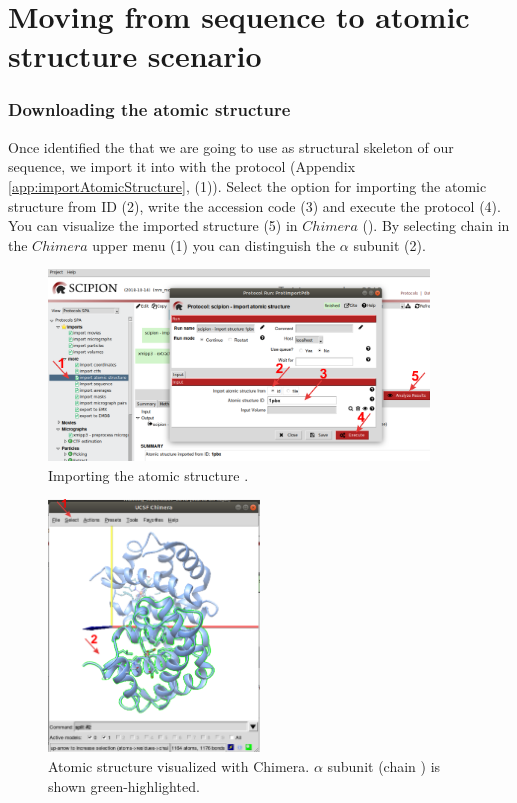 \section{Moving from sequence to atomic structure scenario}

\subsubsection*{Downloading the atomic structure}
  
  Once identified the  that we are going to use as structural skeleton of our sequence, we import it into \scipion with the protocol  (Appendix \ref{app:importAtomicStructure},   (1)). Select the option for importing the atomic structure from ID (2), write the  accession code (3) and execute the protocol (4). You can visualize the imported structure (5) in $Chimera$ (). By selecting chain  in the $Chimera$ upper menu (1) you can distinguish the  $\alpha$ subunit (2).
  
  \begin{figure}[H]
  \centering 
  \captionsetup{width=.7\linewidth} 
  \includegraphics[width=0.90\textwidth]{Images/Fig10.png}
  \caption{Importing the atomic structure .}
  \label{fig:import_atomic_structure}
  \end{figure}
  
  \begin{figure}[H]
  \centering 
  \captionsetup{width=.7\linewidth} 
  \includegraphics[width=0.50\textwidth]{Images/Fig11.png}
  \caption{Atomic structure  visualized with Chimera.  $\alpha$ subunit (chain ) is shown green-highlighted.}
  \label{fig:chimera_visualization_structure}
  \end{figure}
  

